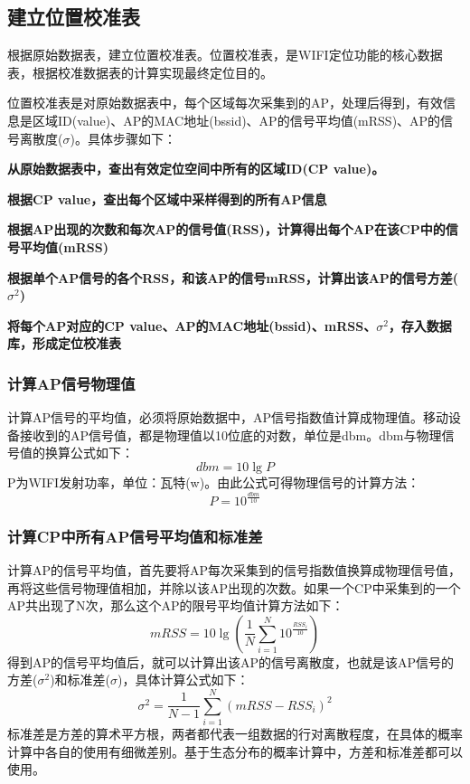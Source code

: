 \documentclass[UTF8, twocolumn ]{ctexart}
\begin{document}
\subsection{建立位置校准表}
根据原始数据表，建立位置校准表。位置校准表，是WIFI定位功能的核心数据表，根据校准数据表的计算实现最终定位目的。
\par
位置校准表是对原始数据表中，每个区域每次采集到的AP，处理后得到，有效信息是区域ID(value)、AP的MAC地址(bssid)、AP的信号平均值(mRSS)、AP的信号离散度($\sigma$)。具体步骤如下：
\par
\begin{compactitem}
\item\textbf{从原始数据表中，查出有效定位空间中所有的区域ID(CP value)。}
\item\textbf{根据CP value，查出每个区域中采样得到的所有AP信息}
\item\textbf{根据AP出现的次数和每次AP的信号值(RSS)，计算得出每个AP在该CP中的信号平均值(mRSS)}
\item\textbf{根据单个AP信号的各个RSS，和该AP的信号mRSS，计算出该AP的信号方差($\sigma^{2}$)}
\item\textbf{将每个AP对应的CP value、AP的MAC地址(bssid)、mRSS、$\sigma^{2}$，存入数据库，形成定位校准表}
\end{compactitem}

\subsubsection{计算AP信号物理值}
计算AP信号的平均值，必须将原始数据中，AP信号指数值计算成物理值。移动设备接收到的AP信号值，都是物理值以10位底的对数，单位是dbm。dbm与物理信号值的换算公式如下：
\begin{displaymath}
dbm=10\lg{P}
\end{displaymath}
P为WIFI发射功率，单位：瓦特(w)。由此公式可得物理信号的计算方法：
\begin{displaymath}
P=10^{\frac{dbm}{10}}
\end{displaymath}

\subsubsection{计算CP中所有AP信号平均值和标准差}
计算AP的信号平均值，首先要将AP每次采集到的信号指数值换算成物理信号值，再将这些信号物理值相加，并除以该AP出现的次数。如果一个CP中采集到的一个AP共出现了N次，那么这个AP的限号平均值计算方法如下：
\begin{displaymath}
mRSS=10\lg\left(\frac{1}{N}\sum^{N}_{i=1}10^{\frac{RSS_{i}}{10}}\right)
\end{displaymath}
得到AP的信号平均值后，就可以计算出该AP的信号离散度，也就是该AP信号的方差($\sigma^{2}$)和标准差($\sigma$)，具体计算公式如下：
\begin{displaymath}
\sigma^{2}=\frac{1}{N-1}\sum^{N}_{i=1}\left(mRSS-RSS_{i}\right)^{2}
\end{displaymath}
标准差是方差的算术平方根，两者都代表一组数据的行对离散程度，在具体的概率计算中各自的使用有细微差别。基于生态分布的概率计算中，方差和标准差都可以使用。
\end{document}
